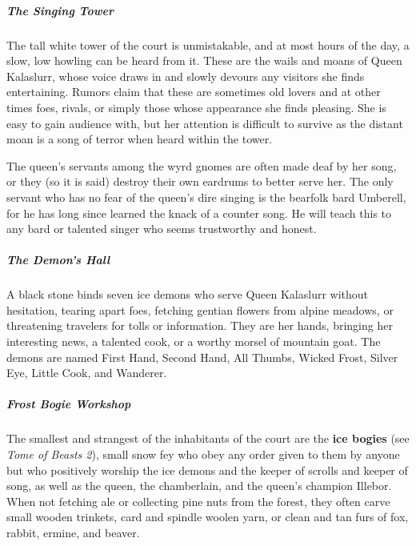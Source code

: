 \documentclass[10pt,a4paper,twoside,bg=print,twocolumn,openany,nodeprecatedcode]{dndbook}
\begin{document}
\subparagraph{The Singing Tower}
The tall white tower of the court is unmistakable, and at most hours of the day, a slow, low howling can be heard from it. These are the wails and moans of Queen Kalaslurr, whose voice draws in and slowly devours any visitors she finds entertaining. Rumors claim that these are sometimes old lovers and at other times foes, rivals, or simply those whose appearance she finds pleasing. She is easy to gain audience with, but her attention is difficult to survive as the distant moan is a song of terror when heard within the tower.

The queen's servants among the wyrd gnomes are often made deaf by her song, or they (so it is said) destroy their own eardrums to better serve her. The only servant who has no fear of the queen's dire singing is the bearfolk bard Umberell, for he has long since learned the knack of a counter song. He will teach this to any bard or talented singer who seems trustworthy and honest.

\subparagraph{The Demon's Hall}
A black stone binds seven ice demons who serve Queen Kalaslurr without hesitation, tearing apart foes, fetching gentian flowers from alpine meadows, or threatening travelers for tolls or information. They are her hands, bringing her interesting news, a talented cook, or a worthy morsel of mountain goat. The demons are named First Hand, Second Hand, All Thumbs, Wicked Frost, Silver Eye, Little Cook, and Wanderer.

\subparagraph{Frost Bogie Workshop}
The smallest and strangest of the inhabitants of the court are the \textbf{ice bogies} (see \textit{Tome of Beasts 2}), small snow fey who obey any order given to them by anyone but who positively worship the ice demons and the keeper of scrolls and keeper of song, as well as the queen, the chamberlain, and the queen's champion Illebor. When not fetching ale or collecting pine nuts from the forest, they often carve small wooden trinkets, card and spindle woolen yarn, or clean and tan furs of fox, rabbit, ermine, and beaver.
\end{document}
